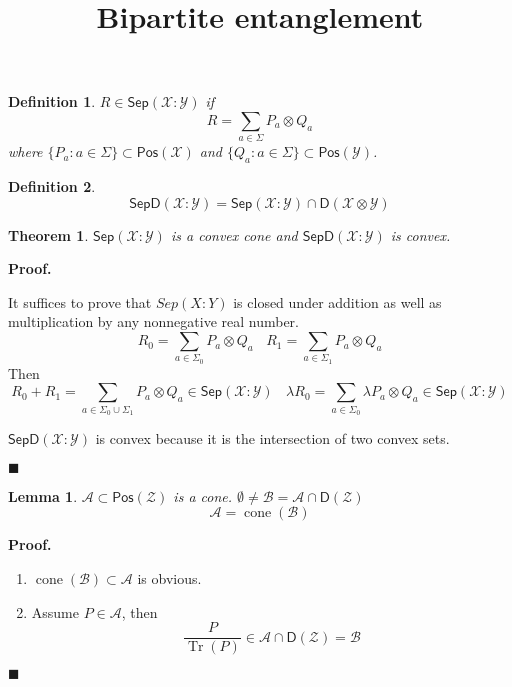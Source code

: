 \documentclass[aps,pra,onecolumn,notitlepage,superscriptaddress]{revtex4-1}
\newcommand{\spc}[1]{\mathcal{#1}}
\newcommand{\Pos}{\mathsf{Pos}}
\newcommand{\D}{\mathsf{D}}
\newcommand{\Sep}{\mathsf{Sep}}
\newcommand{\SepD}{\mathsf{SepD}}
\newcommand{\Tr}{\operatorname{Tr}}
\newcommand{\op}[1]{\operatorname{#1}}
\newtheorem{theo}{Theorem}
\newtheorem{lemma}{Lemma}
\newtheorem{defi}{Definition}
\def\Proof{{\bf Proof.~}}
\def\qed{$\blacksquare$ \newline}
\begin{document}
    \title{Bipartite entanglement}
    \author{}
    \maketitle

    \begin{defi}
        $R \in \Sep(\spc X : \spc Y)$ if
        \begin{equation}
            R = \sum_{a \in \Sigma} P_a \otimes Q_a
        \end{equation}
        where $\{ P_a : a \in \Sigma \} \subset \Pos(\spc X)$ and $\{ Q_a : a \in \Sigma \} \subset \Pos(\spc Y)$.
    \end{defi}
    \begin{defi}
        \begin{equation}
            \SepD(\spc X : \spc Y) = \Sep(\spc X : \spc Y) \cap \D(\spc X \otimes \spc Y)
        \end{equation}
    \end{defi}
    \begin{theo}
        $\Sep(\spc X : \spc Y)$ is a convex cone and $\SepD(\spc X : \spc Y)$ is convex.
    \end{theo}
    \Proof {
        It suffices to prove that $Sep(X : Y)$ is closed under addition as well as multiplication by any nonnegative real number.
        \begin{equation}
            R_0 = \sum_{a \in \Sigma_0} P_a \otimes Q_a \ \ \ \ 
            R_1 = \sum_{a \in \Sigma_1} P_a \otimes Q_a
        \end{equation}
        Then
        \begin{equation}
            R_0 + R_1 = \sum_{a \in \Sigma_0 \cup \Sigma_1} P_a \otimes Q_a \in \Sep(\spc X : \spc Y) \ \ \ \
            \lambda R_0 = \sum_{a \in \Sigma_0} \lambda P_a \otimes Q_a \in \Sep(\spc X : \spc Y)
        \end{equation}

        $\SepD(\spc X : \spc Y)$ is convex because it is the intersection of two convex sets.
    } \qed

    \begin{lemma}
        $\spc A \subset \Pos(\spc Z)$ is a cone. $\emptyset \neq \spc B = \spc A \cap \D(\spc Z)$
        \begin{equation}
            \spc A = \op{cone}(\spc B)
        \end{equation}
    \end{lemma}
    \Proof
        \begin{enumerate}
            \item $\op{cone}(\spc B) \subset \spc A$ is obvious.
            \item Assume $P \in \spc A$, then
            \begin{equation}
                \frac{P}{\Tr(P)} \in \spc A \cap \D(\spc Z) = \spc B
            \end{equation}
        \end{enumerate}
    \qed
\end{document}
